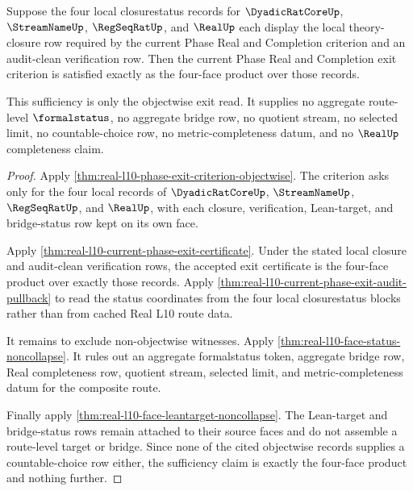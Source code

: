 \begin{theorem}
\label{thm:real-l10-four-face-exit-sufficiency}
Suppose the four local closurestatus records for $\DyadicRatCoreUp$,
$\StreamNameUp$, $\RegSeqRatUp$, and $\RealUp$ each display the local
theory-closure row required by the current Phase Real and Completion
criterion and an audit-clean verification row. Then the current Phase Real
and Completion exit criterion is satisfied exactly as the four-face product
over those records.

This sufficiency is only the objectwise exit read. It supplies no aggregate
route-level $\formalstatus$, no aggregate bridge row, no quotient stream, no
selected limit, no countable-choice row, no metric-completeness datum, and no
$\RealUp$ completeness claim.
\end{theorem}
\begin{proof}
Apply \autoref{thm:real-l10-phase-exit-criterion-objectwise}. The criterion
asks only for the four local records of $\DyadicRatCoreUp$,
$\StreamNameUp$, $\RegSeqRatUp$, and $\RealUp$, with each closure,
verification, Lean-target, and bridge-status row kept on its own face.

Apply \autoref{thm:real-l10-current-phase-exit-certificate}. Under the stated
local closure and audit-clean verification rows, the accepted exit
certificate is the four-face product over exactly those records. Apply
\autoref{thm:real-l10-current-phase-exit-audit-pullback} to read the status
coordinates from the four local closurestatus blocks rather than from cached
Real L10 route data.

It remains to exclude non-objectwise witnesses. Apply
\autoref{thm:real-l10-face-status-noncollapse}. It rules out an aggregate
formalstatus token, aggregate bridge row, Real completeness row, quotient
stream, selected limit, and metric-completeness datum for the composite
route.

Finally apply \autoref{thm:real-l10-face-leantarget-noncollapse}. The
Lean-target and bridge-status rows remain attached to their source faces and
do not assemble a route-level target or bridge. Since none of the cited
objectwise records supplies a countable-choice row either, the sufficiency
claim is exactly the four-face product and nothing further.
\end{proof}

